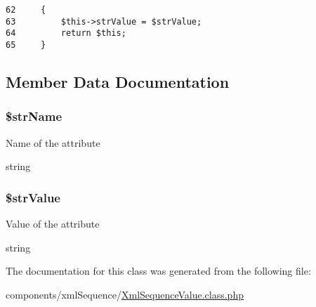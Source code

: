 \begin{Code}\begin{verbatim}62     {
63         $this->strValue = $strValue;
64         return $this;
65     }
\end{verbatim}
\end{Code}




\subsection{Member Data Documentation}
\hypertarget{class_xml_sequence_value_90edf7538a74be8ac5ce46baaf203382}{
\subsubsection[{\$strName}]{\setlength{\rightskip}{0pt plus 5cm}\$strName}}
\label{class_xml_sequence_value_90edf7538a74be8ac5ce46baaf203382}


Name of the attribute

string \hypertarget{class_xml_sequence_value_4ca01dcd54c8197f45702984773b68a4}{
\subsubsection[{\$strValue}]{\setlength{\rightskip}{0pt plus 5cm}\$strValue}}
\label{class_xml_sequence_value_4ca01dcd54c8197f45702984773b68a4}


Value of the attribute

string 

The documentation for this class was generated from the following file:\begin{CompactItemize}
\item 
components/xmlSequence/\hyperlink{_xml_sequence_value_8class_8php}{XmlSequenceValue.class.php}\end{CompactItemize}
